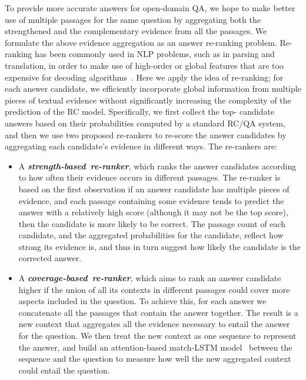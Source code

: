 \documentclass{article} \usepackage{iclr2018_conference,times}
\def \coherence {strength-based}
\def \union {coverage-based}
\begin{document}
To provide more accurate answers for open-domain QA, we hope to make better use of multiple passages for the same question by aggregating both the strengthened 
and the complementary evidence from all the passages.
We formulate the above evidence aggregation as an answer re-ranking problem.
Re-ranking has been commonly used in NLP problems, such as in parsing and translation, in order to make use of high-order or global features that are too expensive for decoding algorithms~\citep{collins2005discriminative,shen2004discriminative,huang2008forest,dyer2016recurrent}. Here we apply the idea of re-ranking; for each answer candidate, we efficiently incorporate global information from multiple pieces of textual evidence without significantly increasing the complexity of the prediction of the RC model.
Specifically, we first collect the top- candidate answers based on their probabilities computed by a standard RC/QA system, and then we use two proposed re-rankers to re-score the answer candidates by aggregating each candidate's evidence in different ways. The re-rankers are:
\begin{itemize}[labelindent=0.5em,labelsep=0.2cm,leftmargin=0.5cm]
\item A \textbf{\emph{\coherence\ re-ranker}}, which ranks the answer candidates according to how often their evidence occurs in different passages. 
The re-ranker is based on the first observation if an answer candidate has multiple pieces of evidence, and each passage containing some evidence tends to predict the answer with a relatively high score (although it may not be the top score), then the candidate is more likely to be correct. The passage count of each candidate, and the aggregated probabilities for the candidate, reflect how strong its evidence is, and thus in turn suggest how likely the candidate is the corrected answer.
\item A \textbf{\emph{\union\ re-ranker}}, which aims to rank an answer candidate higher if the union of all its contexts in different passages could cover more aspects included in the question. To achieve this, for each answer we concatenate all the passages that contain the answer together. The result is a new context that aggregates all the evidence necessary to entail the answer for the question.
We then treat the new context as one sequence to represent the answer, and build an attention-based match-LSTM model~\citep{wang2016machine} between the sequence and the question to measure how well the new aggregated context could entail the question.
\end{itemize}
\end{document}
